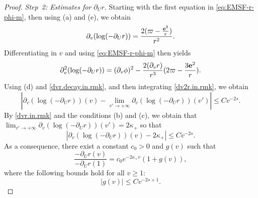 \documentclass[10pt, reqno]{amsart}
\theoremstyle{definition}
\theoremstyle{remark}
\numberwithin{equation}{section}
\newcommand{\abs}[1]{\vert#1\vert}
\newcommand{\rd}{\partial}
\newcommand{\0}{\emptyset}
\newcommand{\f}{\frac}
\newcommand{\pfstep}[1]{\vspace{.5em} {\it \noindent #1.}}
\begin{document}
\begin{proof}
\pfstep{Step~2: Estimates for $\rd_U r$} Starting with the first equation in \eqref{eq:EMSF-r-phi-m}, then using (a) and (e), we obtain
\begin{equation}\label{dvr.in.rmk}
\rd_v (\log (- \rd_U r)) = \f{2(\varpi-\f{{\bf e}^2}{r})}{r^2}.
\end{equation}
Differentiating in $v$ and using \eqref{eq:EMSF-r-phi-m} then yields
\begin{equation}\label{dv2r.in.rmk}
\rd_v^2 (\log (- \rd_U r)) = (\rd_v\phi)^2 -\f {2(\rd_v r)}{r^3} (2\varpi - \f{3{\bf e}^2}{r}).
\end{equation}
Using (d) and \eqref{dvr.decay.in.rmk}, and then integrating \eqref{dv2r.in.rmk}, we obtain
$$\left| \rd_v (\log (- \rd_U r))(v) - \lim_{v'\to +\infty} \rd_v (\log (- \rd_U r))(v')\right| \leq C v^{-2s}.$$
By \eqref{dvr.in.rmk} and the conditions (b) and (c), we obtain that $\lim_{v'\to +\infty} \rd_v (\log (- \rd_U r))(v') = 2\kappa_+$ so that
\begin{equation}\label{dvdur.in.rmk}
\left| \rd_v (\log (- \rd_U r))(v) - 2\kappa_+\right| \leq C v^{-2s}.
\end{equation}
As a consequence, there exist a constant $c_{0} > 0$ and $g(v)$ such that 
\begin{equation} \label{dur.eq.in.rmk}
\frac{-\rd_{U} r (v)}{-\rd_{U} r(1)}= c_{0} e^{-2 \kappa_+ v} (1+g(v)), 
\end{equation}
where the following bounds hold for all $v \geq 1$:
\begin{equation}\label{dur.bd.in.rmk}
\abs{g(v)} \leq C v^{-2s+1}.
\end{equation}


\end{proof}
\end{document}

